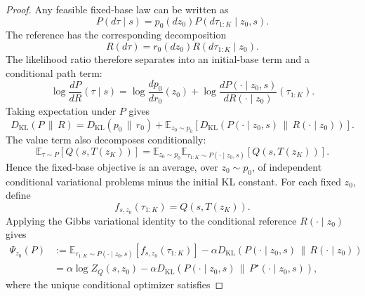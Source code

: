 \documentclass[11pt]{article}
\begin{document}
\begin{proof}
Any feasible fixed-base law can be written as
\begin{equation}
  P(d\tau\mid s)
  =
  p_0(dz_0)
  P(d\tau_{1:K}\mid z_0,s).
\end{equation}
The reference has the corresponding decomposition
\begin{equation}
  R(d\tau)
  =
  r_0(dz_0)
  R(d\tau_{1:K}\mid z_0).
\end{equation}
The likelihood ratio therefore separates into an initial-base term and a conditional path term:
\begin{equation}
  \log
  \frac{
    dP
  }{
    dR
  }(\tau\mid s)
  =
  \log
  \frac{
    dp_0
  }{
    dr_0
  }(z_0)
  +
  \log
  \frac{
    dP(\cdot\mid z_0,s)
  }{
    dR(\cdot\mid z_0)
  }(\tau_{1:K}).
\end{equation}
Taking expectation under $P$ gives
\begin{equation}
  D_{\mathrm{KL}}
  \left(
    P
    \,\|\,R
  \right)
  =
  D_{\mathrm{KL}}
  \left(
    p_0
    \,\|\,
    r_0
  \right)
  +
  \mathbb E_{z_0\sim p_0}
  \left[
    D_{\mathrm{KL}}
    \left(
      P(\cdot\mid z_0,s)
      \,\|\,R(\cdot\mid z_0)
    \right)
  \right].
\end{equation}
The value term also decomposes conditionally:
\begin{equation}
  \mathbb E_{\tau\sim P}
  \left[
    Q(s,T(z_K))
  \right]
  =
  \mathbb E_{z_0\sim p_0}
  \mathbb E_{\tau_{1:K}\sim P(\cdot\mid z_0,s)}
  \left[
    Q(s,T(z_K))
  \right].
\end{equation}
Hence the fixed-base objective is an average, over $z_0\sim p_0$, of independent conditional variational problems minus the initial KL constant. For each fixed $z_0$, define
\begin{equation}
  f_{s,z_0}(\tau_{1:K})
  =
  Q(s,T(z_K)).
\end{equation}
Applying the Gibbs variational identity to the conditional reference $R(\cdot\mid z_0)$ gives
\begin{align}
  \Psi_{z_0}(P)
  &:=
  \mathbb E_{\tau_{1:K}\sim P(\cdot\mid z_0,s)}
  \left[
    f_{s,z_0}(\tau_{1:K})
  \right]
  -
  \alpha
  D_{\mathrm{KL}}
  \left(
    P(\cdot\mid z_0,s)
    \,\|\,R(\cdot\mid z_0)
  \right)
  \nonumber\\
  &=
  \alpha\log Z_Q(s,z_0)
  -
  \alpha
  D_{\mathrm{KL}}
  \left(
    P(\cdot\mid z_0,s)
    \,\|\,P^\star(\cdot\mid z_0,s)
  \right),
\end{align}
where the unique conditional optimizer satisfies

\end{proof}
\end{document}
